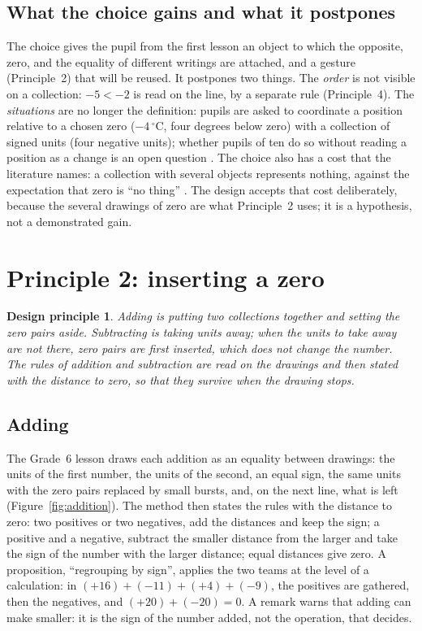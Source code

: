 \documentclass[11pt,a4paper]{article}
\newtheorem{principle}{Design principle}
\theoremstyle{definition}
\begin{document}
\subsection{What the choice gains and what it postpones}
The choice gives the pupil from the first lesson an object to which the opposite, zero, and the equality of different writings are attached, and a gesture (Principle~2) that will be reused. It postpones two things. The \emph{order} is not visible on a collection: $-5<-2$ is read on the line, by a separate rule (Principle~4). The \emph{situations} are no longer the definition: pupils are asked to coordinate a position relative to a chosen zero ($-4\,^\circ$C, four degrees below zero) with a collection of signed units (four negative units); whether pupils of ten do so without reading a position as a change is an open question \citep{Vergnaud1982}. The choice also has a cost that the literature names: a collection with several objects represents nothing, against the expectation that zero is ``no thing'' \citep{NurnbergerHaag2015PMENA}. The design accepts that cost deliberately, because the several drawings of zero are what Principle~2 uses; it is a hypothesis, not a demonstrated gain.

\section{Principle 2: inserting a zero}\label{sec:p2}

\begin{principle}
Adding is putting two collections together and setting the zero pairs aside. Subtracting is taking units away; when the units to take away are not there, zero pairs are first inserted, which does not change the number. The rules of addition and subtraction are read on the drawings and then stated with the distance to zero, so that they survive when the drawing stops.
\end{principle}

\subsection{Adding}
The Grade~6 lesson draws each addition as an equality between drawings: the units of the first number, the units of the second, an equal sign, the same units with the zero pairs replaced by small bursts, and, on the next line, what is left (Figure~\ref{fig:addition}). The method then states the rules with the distance to zero: two positives or two negatives, add the distances and keep the sign; a positive and a negative, subtract the smaller distance from the larger and take the sign of the number with the larger distance; equal distances give zero. A proposition, ``regrouping by sign'', applies the two teams at the level of a calculation: in $(+16)+(-11)+(+4)+(-9)$, the positives are gathered, then the negatives, and $(+20)+(-20)=0$. A remark warns that adding can make smaller: it is the sign of the number added, not the operation, that decides.
\end{document}
